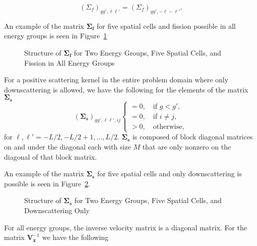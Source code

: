\begin{lemma}
\label{lemma:sigf}
\begin{equation}
	(\Sigma_{f})_{gg',\ell \ell'} = (\Sigma_{f})_{gg',-\ell -\ell'}. 
\end{equation}
\end{lemma}

An example of the matrix $\mathbf{\Sigma_{f}}$ for five spatial cells and fission possible in all energy groups is seen in Figure~\ref{fig:F}

\begin{figure}[!htbp]
	\begin{center}\resizebox{0.75\textwidth}{!}{} \end{center}
	\caption{Structure of $\mathbf{\Sigma_{f}}$ for Two Energy Groups, Five Spatial Cells, and Fission in All Energy Groups}\label{fig:F}
\end{figure}

\clearpage

For a positive scattering kernel in the entire problem domain where only downscattering is allowed, we have the following for the elements of the matrix $\mathbf{\Sigma_{s}}$
\begin{equation}
		(\mathbf{\Sigma_{s}})_{gg',\ell \ell', ij}
	\begin{cases}
 		= 0, \quad \text{if } g < g', \\
 		= 0, \quad \text{if } i \neq j, \\
		> 0, \quad \text{otherwise},
	\end{cases}
\end{equation}
for $\ell, \ell' = -L/2, -L/2+1, \dots, L/2$. $\mathbf{\Sigma_{s}}$ is composed of block diagonal matrices on and under the diagonal each with size $M$ that are only nonzero on the diagonal of that block matrix.

An example of the matrix $\mathbf{\Sigma_{s}}$ for five spatial cells and only downscattering is possible is seen in Figure~\ref{fig:S}.

\begin{figure}[!htbp]
	\centering
	\resizebox{0.75\textwidth}{!}{}
	\caption{Structure of $\mathbf{\Sigma_{s}}$ for Two Energy Groups, Five Spatial Cells, and Downscattering Only}\label{fig:S}
\end{figure}

For all energy groups, the inverse velocity matrix is a diagonal matrix. For the matrix $\mathbf{V}_{\mathbf{z}}^{-1}$ we have the following

